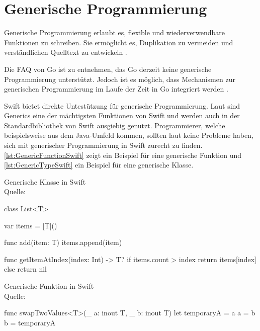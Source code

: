 \chapter{Generische Programmierung}
Generische Programmierung erlaubt es, flexible und wiederverwendbare Funktionen zu schreiben. 
Sie ermöglicht es, Duplikation zu vermeiden und verständlichen Quelltext zu entwickeln \cite[S.371]{Apple.2017}.


Die FAQ von Go ist zu entnehmen, das Go derzeit keine generische Programmierung unterstützt. 
Jedoch ist es möglich, dass Mechanismen zur generischen Programmierung im Laufe der Zeit in Go integriert werden \cite{Golang.FAQ}.


Swift bietet direkte Untestützung für generische Programmierung.
Laut \cite[S.371]{Apple.2017} sind Generics eine der mächtigsten Funktionen von Swift und werden auch in der Standardbibliothek von Swift ausgiebig genutzt.
Programmierer, welche beispielsweise aus dem Java-Umfeld kommen, sollten laut \cite[S.206]{Hoffman.2017} keine Probleme haben, sich mit generischer Programmierung in Swift zurecht zu finden.
\autoref{lst:GenericFunctionSwift} zeigt ein Beispiel für eine generische Funktion und \autoref{lst:GenericTypeSwift} ein Beispiel für eine generische Klasse.

\begin{listing}[H]
\caption{Generische Klasse in Swift \\ Quelle:\cite[S.213]{Hoffman.2017}}
\label{lst:GenericTypeSwift}
\begin{SwiftCode}
class List<T> {
    var items = [T]()
    
    func add(item: T) {
        items.append(item)
    }
    
    func getItemAtIndex(index: Int) -> T? {
        if items.count > index {
            return items[index]
        } else {
            return nil
        }
    }
}
\end{SwiftCode}
\end{listing}

\begin{listing}[H]
\caption{Generische Funktion in Swift \\ Quelle:\cite[S.373]{Apple.2017}}
\label{lst:GenericFunctionSwift}
\begin{SwiftCode}
func swapTwoValues<T>(_ a: inout T, _ b: inout T) {
    let temporaryA = a
    a = b
    b = temporaryA
}
\end{SwiftCode}
\end{listing}


